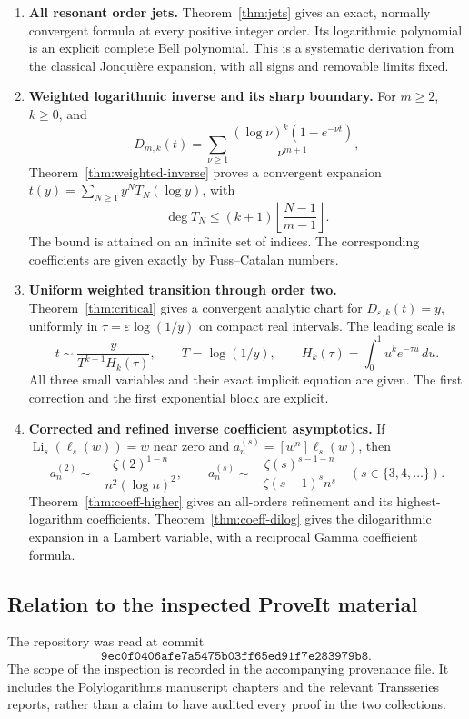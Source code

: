 \documentclass[11pt,a4paper]{article}
\numberwithin{equation}{section}
\theoremstyle{definition}
\theoremstyle{remark}
\DeclareMathOperator{\Li}{Li}
\newcommand{\dd}{\,d}
\newcommand{\eps}{\varepsilon}
\newcommand{\LiInv}{\ell}
\newcommand{\repoCommit}{9ec0f0406afe7a5475b03ff65ed91f7e283979b8}
\begin{document}
\begin{enumerate}
\item \textbf{All resonant order jets.}
Theorem~\ref{thm:jets} gives an exact, normally convergent formula at every
positive integer order.  Its logarithmic polynomial is an explicit
complete Bell polynomial.  This is a systematic derivation from the
classical Jonqui\`ere expansion, with all signs and removable limits fixed.

\item \textbf{Weighted logarithmic inverse and its sharp boundary.}
For \(m\ge2\), \(k\ge0\), and
\[
 D_{m,k}(t)=\sum_{\nu\ge1}
 \frac{(\log\nu)^k(1-e^{-\nu t})}{\nu^{m+1}},
\]
Theorem~\ref{thm:weighted-inverse} proves a convergent expansion
\(t(y)=\sum_{N\ge1}y^NT_N(\log y)\), with
\[
 \deg T_N\le(k+1)\left\lfloor\frac{N-1}{m-1}\right\rfloor.
\]
The bound is attained on an infinite set of indices.  The corresponding
coefficients are given exactly by Fuss--Catalan numbers.

\item \textbf{Uniform weighted transition through order two.}
Theorem~\ref{thm:critical} gives a convergent analytic chart for
\(D_{\eps,k}(t)=y\), uniformly in
\(\tau=\eps\log(1/y)\) on compact real intervals.  The leading scale is
\[
 t\sim \frac{y}{T^{k+1}H_k(\tau)},\qquad
 T=\log(1/y),\qquad H_k(\tau)=\int_0^1u^ke^{-\tau u}\dd u.
\]
All three small variables and their exact implicit equation are given.
The first correction and the first exponential block are explicit.

\item \textbf{Corrected and refined inverse coefficient asymptotics.}
If \(\Li_s(\LiInv_s(w))=w\) near zero and
\(a_n^{(s)}=[w^n]\LiInv_s(w)\), then
\[
 a_n^{(2)}\sim-\frac{\zeta(2)^{1-n}}{n^2(\log n)^2},
 \qquad
 a_n^{(s)}\sim
 -\frac{\zeta(s)^{s-1-n}}{\zeta(s-1)^s n^s}
 \quad(s\in\{3,4,\ldots\}).
\]
Theorem~\ref{thm:coeff-higher} gives an all-orders refinement and its
highest-logarithm coefficients.  Theorem~\ref{thm:coeff-dilog} gives
the dilogarithmic expansion in a Lambert variable, with a reciprocal
Gamma coefficient formula.
\end{enumerate}

\subsection{Relation to the inspected ProveIt material}

The repository was read at commit
\[
 \texttt{\repoCommit}.
\]
The scope of the inspection is recorded in the accompanying provenance
file.  It includes the Polylogarithms manuscript chapters and the
relevant Transseries reports, rather than a claim to have audited every
proof in the two collections.
\end{document}
